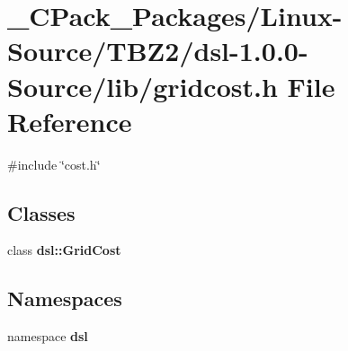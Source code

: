 \section{\_\-CPack\_\-Packages/Linux-\/Source/TBZ2/dsl-\/1.0.0-\/Source/lib/gridcost.h File Reference}
\label{__CPack__Packages_2Linux-Source_2TBZ2_2dsl-1_80_80-Source_2lib_2gridcost_8h}
{\ttfamily \#include \char`\"{}cost.h\char`\"{}}\par
\subsection*{Classes}
\begin{DoxyCompactItemize}
\item 
class {\bf dsl::GridCost}
\end{DoxyCompactItemize}
\subsection*{Namespaces}
\begin{DoxyCompactItemize}
\item 
namespace {\bf dsl}
\end{DoxyCompactItemize}
